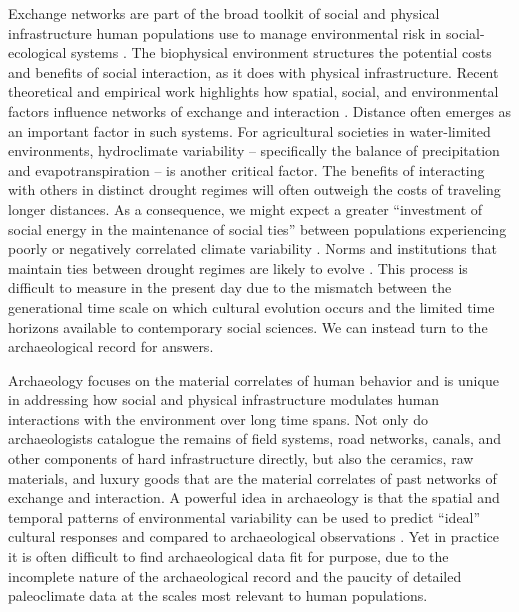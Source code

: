 \documentclass[11pt]{iopart}
\begin{document}
Exchange networks are part of the broad toolkit of social and physical infrastructure human populations use to manage environmental risk in social-ecological systems \parencite{Anderies2015}. The biophysical environment structures the potential costs and benefits of social interaction, as it does with physical infrastructure. Recent theoretical and empirical work highlights how spatial, social, and environmental factors influence networks of exchange and interaction \parencite{Fafchamps2007,Bloch2008,Nolin2010,Verdery2012,Freeman2014,Koster2014,Hao2015a,Schnegg2015}. Distance often emerges as an important factor in such systems. For agricultural societies in water-limited environments, hydroclimate variability -- specifically the balance of precipitation and evapotranspiration -- is another critical factor. The benefits of interacting with others in distinct drought regimes will often outweigh the costs of traveling longer distances. As a consequence, we might expect a greater ``investment of social energy in the maintenance of social ties'' between populations experiencing poorly or negatively correlated climate variability \parencite{Rautman1993a}. Norms and institutions that maintain ties between drought regimes are likely to evolve \parencite{Durante2009}. This process is difficult to measure in the present day due to the mismatch between the generational time scale on which cultural evolution occurs and the limited time horizons available to contemporary social sciences. We can instead turn to the archaeological record for answers. 

Archaeology focuses on the material correlates of human behavior and is unique in addressing how social and physical infrastructure modulates human interactions with the environment over long time spans. Not only do archaeologists catalogue the remains of field systems, road networks, canals, and other components of hard infrastructure directly, but also the ceramics, raw materials, and luxury goods that are the material correlates of past networks of exchange and interaction. A powerful idea in archaeology is that the spatial and temporal patterns of environmental variability can be used to predict ``ideal'' cultural responses and compared to archaeological observations \parencite{Halstead1989}. Yet in practice it is often difficult to find archaeological data fit for purpose, due to the incomplete nature of the archaeological record and the paucity of detailed paleoclimate data at the scales most relevant to human populations. 
\end{document}
